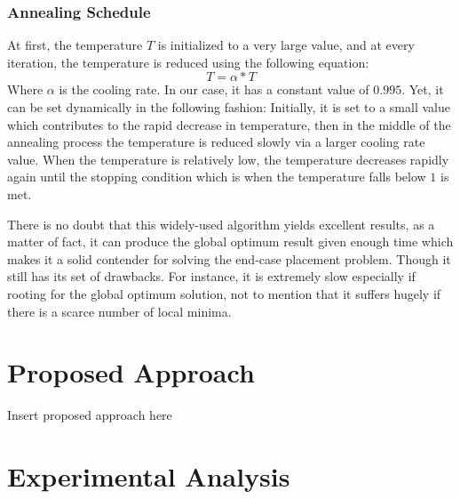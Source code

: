 \documentclass[conference]{IEEEtran}
\begin{document}
\subsubsection{Annealing Schedule}

At first, the temperature $T$ is initialized to a very large value, and at every iteration, the temperature is reduced using the following equation:
\begin{equation}
    T = \alpha*T
\end{equation}
Where $\alpha$ is the cooling rate. In our case, it has a constant value of $0.995$. Yet, it can be set dynamically in the following fashion: Initially, it is set to a small value which contributes to the rapid decrease in temperature, then in the middle of the annealing process the temperature is reduced slowly via a larger cooling rate value. When the temperature is relatively low, the temperature decreases rapidly again until the stopping condition which is when the temperature falls below $1$ is met.

\medskip

There is no doubt that this widely-used algorithm yields excellent results, as a matter of fact, it can produce the global optimum result given enough time which makes it a solid contender for solving the end-case placement problem. Though it still has its set of drawbacks. For instance, it is extremely slow especially if rooting for the global optimum solution, not to mention that it suffers hugely if there is a scarce number of local minima.


\section{Proposed Approach}

Insert proposed approach here


\section{Experimental Analysis}
\end{document}
